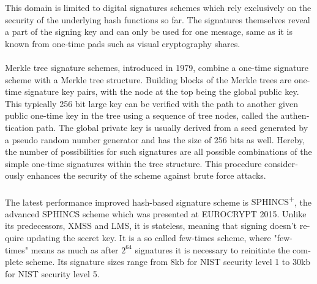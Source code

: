 \documentclass[a4paper,11pt]{article}
\begin{document}
\begin{otherlanguage}{english}
\begin{multicols}{2}
This domain is limited to digital signatures schemes which rely exclusively on the security of the underlying hash functions so far. The signatures themselves reveal a part of the signing key and can only be used for one message, same as it is known from one-time pads such as visual cryptography shares. \\
\\
Merkle tree signature schemes, introduced in 1979, combine a one-time signature scheme with a Merkle tree structure. Building blocks of the Merkle trees are one-time signature key pairs, with the node at the top being the global public key. This typically 256 bit large key can be verified with the path to another given public one-time key in the tree using a sequence of tree nodes, called the authentication path. The global private key is usually derived from a seed generated by a pseudo random number generator and has the size of 256 bits as well.
Hereby, the number of possibilities for such signatures are all possible combinations of the simple one-time signatures within the tree structure. This procedure considerously enhances the security of the scheme against brute force attacks. \\
\\
The latest performance improved hash-based signature scheme is \textsc{SPHINCS\textsuperscript{+}}\cite{SPH+}, the advanced \textsc{SPHINCS} \cite{SPH} scheme which was presented at EUROCRYPT 2015. Unlike its predecessors, XMSS and LMS, it is stateless, meaning that signing doesn't require updating the secret key. It is a so called few-times scheme, where "few-times" means as much as after $2^{64}$ signatures it is necessary to reinitiate the complete scheme. Its signature sizes range from 8kb for NIST security level 1 to 30kb for NIST security level 5.



\end{multicols}
\end{otherlanguage}
\end{document}
